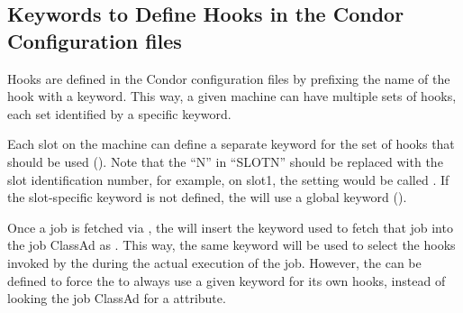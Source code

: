 
% 


\subsection{\label{sec:job-hooks-keywords}
Keywords to Define Hooks in the Condor Configuration files }

Hooks are defined in the Condor configuration files by prefixing
the name of the hook with a keyword.
This way, a given machine can have multiple sets of hooks, each set
identified by a specific keyword.

Each slot on the machine can define a separate keyword for the set
of hooks that should be used (\Macro{[SLOTN\_JOB\_HOOK\_KEYWORD}).
Note that the ``N'' in ``SLOTN'' should be replaced with the slot
identification number, for example, on slot1, the setting would be
called \MacroNI{[SLOT1\_JOB\_HOOK\_KEYWORD}.
If the slot-specific keyword is not defined, the  will
use a global keyword ().

Once a job is fetched via , the
 will insert the keyword used to fetch that job into
the job ClassAd as .
This way, the same keyword will be used to select the hooks invoked by
the  during the actual execution of the job.
However, the  can be defined to
force the  to always use a given keyword for its own
hooks, instead of looking the job ClassAd for a 
attribute.


